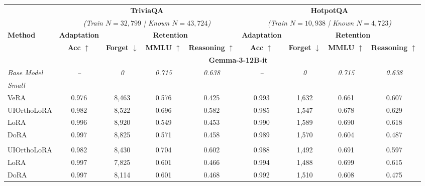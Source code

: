 \begin{table}[t]
\centering
\small
\setlength{\tabcolsep}{5pt}
\begin{adjustbox}{max width=\linewidth}
\begin{tabular}{l | c ccc | c ccc}
\toprule
& \multicolumn{4}{c|}{\textbf{TriviaQA}} & \multicolumn{4}{c}{\textbf{HotpotQA}} \\
& \multicolumn{4}{c|}{\textit{(Train $N=32{,}799$ | Known $N=43{,}724$)}} & \multicolumn{4}{c}{\textit{(Train $N=10{,}938$ | Known $N=4{,}723$)}} \\
\cmidrule(lr){2-5} \cmidrule(lr){6-9}
\multirow{2}{*}{\textbf{Method}} & \textbf{Adaptation} & \multicolumn{3}{c|}{\textbf{Retention}} & \textbf{Adaptation} & \multicolumn{3}{c}{\textbf{Retention}} \\
\cmidrule(lr){2-2} \cmidrule(lr){3-5} \cmidrule(lr){6-6} \cmidrule(lr){7-9}
& \textbf{Acc} $\uparrow$ & \textbf{Forget} $\downarrow$ & \textbf{MMLU} $\uparrow$ & \textbf{Reasoning} $\uparrow$ & \textbf{Acc} $\uparrow$ & \textbf{Forget} $\downarrow$ & \textbf{MMLU} $\uparrow$ & \textbf{Reasoning} $\uparrow$ \\
\midrule
\multicolumn{1}{c}{} & \multicolumn{8}{c}{\textbf{Gemma-3-12B-it}} \\
\midrule
\addlinespace[0.3ex]
\rowcolor{gray!10} \textit{Base Model} & \textit{--} & \textit{0} & \textit{0.715} & \textit{0.638} & \textit{--} & \textit{0} & \textit{0.715} & \textit{0.638} \\
\midrule
\multicolumn{9}{l}{\textit{Small}} \\
VeRA         & 0.976 & 8,463 & 0.576 & 0.425 & 0.993 & 1,632 & 0.661 & 0.607 \\
UIOrthoLoRA & 0.982 & 8,522 & 0.696 & 0.582 & 0.985 & 1,547 & 0.678 & 0.629 \\
LoRA         & 0.996 & 8,920 & 0.549 & 0.453 & 0.990 & 1,589 & 0.690 & 0.618 \\
DoRA         & 0.997 & 8,825 & 0.571 & 0.458 & 0.989 & 1,570 & 0.604 & 0.487 \\
\addlinespace
\multicolumn{9}{l}{\textit{Medium}} \\
UIOrthoLoRA & 0.982 & 8,430 & 0.704 & 0.602 & 0.988 & 1,492 & 0.691 & 0.597 \\
LoRA         & 0.997 & 7,825 & 0.601 & 0.466 & 0.994 & 1,488 & 0.699 & 0.615 \\
DoRA         & 0.997 & 8,114 & 0.601 & 0.468 & 0.992 & 1,510 & 0.608 & 0.475 \\

\end{tabular}
\end{adjustbox}
\end{table}
